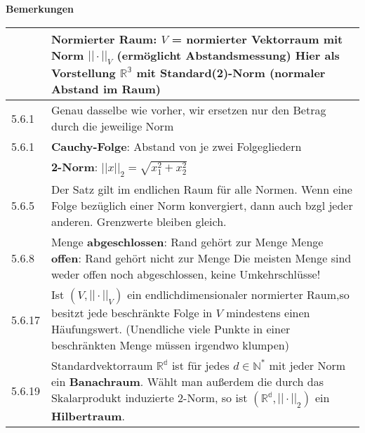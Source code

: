\noindent
\textbf{Bemerkungen}
\begin{table}[H]
\begin{tabularx}{\textwidth}{X m{16cm}}
    \toprule

          & Normierter Raum: $V$ = normierter Vektorraum mit Norm $||\cdot||_V$ (ermöglicht Abstandsmessung) \hfill \break
            Hier als Vorstellung $\mathbb{R^3}$ mit Standard(2)-Norm (normaler Abstand im Raum) \\
    \midrule
    5.6.1 & Genau dasselbe wie vorher, wir ersetzen nur den Betrag durch die jeweilige Norm \\
    \midrule
    5.6.1 & \textbf{Cauchy-Folge}: Abstand von je zwei Folgegliedern \\
    \midrule
          & \textbf{2-Norm}: $||x||_2 = \sqrt{x_1^2 + x_2^2}$ \\
    \midrule
    5.6.5 & Der Satz gilt im endlichen Raum für alle Normen. \hfill \break
            Wenn eine Folge bezüglich einer Norm konvergiert, dann auch bzgl jeder anderen. \hfill \break 
            Grenzwerte bleiben gleich. \\
    \midrule
    5.6.8 & Menge \textbf{abgeschlossen}: Rand gehört zur Menge \hfill \break
            Menge \textbf{offen}: Rand gehört nicht zur Menge \hfill \break
            Die meisten Menge sind weder offen noch abgeschlossen, keine Umkehrschlüsse! \\
    \midrule
    5.6.17& Ist $(V,||\cdot||_V)$ ein endlichdimensionaler normierter Raum,so besitzt jede beschränkte Folge in 
            $V$ mindestens einen Häufungswert. (Unendliche viele Punkte in einer beschränkten Menge müssen irgendwo klumpen) \\
    \midrule
    5.6.19& Standardvektorraum $\mathbb{R^d}$ ist für jedes $d \in \mathbb{N^*}$ mit jeder Norm ein \textbf{Banachraum}. \hfill \break
            Wählt man au\ss erdem die durch das Skalarprodukt induzierte 2-Norm, so ist $(\mathbb{R^d}, ||\cdot||_2)$ ein \textbf{Hilbertraum}. \\

    \bottomrule
\end{tabularx}
\end{table}

\pagebreak

